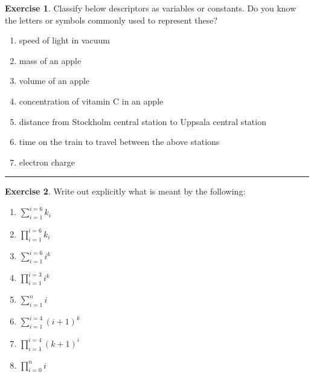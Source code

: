 \documentclass[
]{book}
\providecommand{\tightlist}{%
  \setlength{\itemsep}{0pt}\setlength{\parskip}{0pt}}
\theoremstyle{definition}
\theoremstyle{definition}
\theoremstyle{definition}
\newtheorem{exercise}{Exercise}[chapter]
\theoremstyle{remark}
\begin{document}
\begin{exercise}
\protect\hypertarget{exr:m-notations-variables-constants}{}{\label{exr:m-notations-variables-constants} }Classify below descriptors as variables or constants. Do you know the letters or symbols commonly used to represent these?

\begin{enumerate}
\def\labelenumi{\alph{enumi})}
\tightlist
\item
  speed of light in vacuum
\item
  mass of an apple
\item
  volume of an apple
\item
  concentration of vitamin C in an apple
\item
  distance from Stockholm central station to Uppsala central station
\item
  time on the train to travel between the above stations
\item
  electron charge
\end{enumerate}
\end{exercise}

\begin{center}\rule{0.5\linewidth}{0.5pt}\end{center}

\begin{exercise}
\protect\hypertarget{exr:m-notations-sigma-product}{}{\label{exr:m-notations-sigma-product} }Write out explicitly what is meant by the following:

\begin{enumerate}
\def\labelenumi{\alph{enumi})}
\item
  \(\sum_{i=1}^{i=6}k_i\)
\item
  \(\prod_{i=1}^{i=6}k_i\)
\item
  \(\sum_{i=1}^{i=6}i^k\)
\item
  \(\prod_{i=1}^{i=3}i^k\)
\item
  \(\sum_{i=1}^{n}i\)
\item
  \(\sum_{i=1}^{i=4}(i + 1)^k\)
\item
  \(\prod_{i=1}^{i=4}(k + 1)^i\)
\item
  \(\prod_{i=0}^{n}i\)
\end{enumerate}
\end{exercise}
\end{document}
